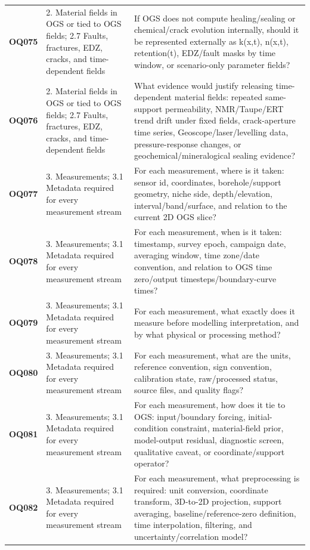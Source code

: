 \begin{longtable}{@{}L{0.10\textwidth} L{0.23\textwidth} L{0.59\textwidth}@{}}
\addlinespace[0.16em]
\textbf{OQ075} & 2. Material fields in OGS or tied to OGS fields; 2.7 Faults, fractures, EDZ, cracks, and time-dependent fields & If OGS does not compute healing/sealing or chemical/crack evolution internally, should it be represented externally as k(x,t), n(x,t), retention(t), EDZ/fault masks by time window, or scenario-only parameter fields?\\
\addlinespace[0.16em]
\textbf{OQ076} & 2. Material fields in OGS or tied to OGS fields; 2.7 Faults, fractures, EDZ, cracks, and time-dependent fields & What evidence would justify releasing time-dependent material fields: repeated same-support permeability, NMR/Taupe/ERT trend drift under fixed fields, crack-aperture time series, Geoscope/laser/levelling data, pressure-response changes, or geochemical/mineralogical sealing evidence?\\
\addlinespace[0.16em]
\textbf{OQ077} & 3. Measurements; 3.1 Metadata required for every measurement stream & For each measurement, where is it taken: sensor id, coordinates, borehole/support geometry, niche side, depth/elevation, interval/band/surface, and relation to the current 2D OGS slice?\\
\addlinespace[0.16em]
\textbf{OQ078} & 3. Measurements; 3.1 Metadata required for every measurement stream & For each measurement, when is it taken: timestamp, survey epoch, campaign date, averaging window, time zone/date convention, and relation to OGS time zero/output timesteps/boundary-curve times?\\
\addlinespace[0.16em]
\textbf{OQ079} & 3. Measurements; 3.1 Metadata required for every measurement stream & For each measurement, what exactly does it measure before modelling interpretation, and by what physical or processing method?\\
\addlinespace[0.16em]
\textbf{OQ080} & 3. Measurements; 3.1 Metadata required for every measurement stream & For each measurement, what are the units, reference convention, sign convention, calibration state, raw/processed status, source files, and quality flags?\\
\addlinespace[0.16em]
\textbf{OQ081} & 3. Measurements; 3.1 Metadata required for every measurement stream & For each measurement, how does it tie to OGS: input/boundary forcing, initial-condition constraint, material-field prior, model-output residual, diagnostic screen, qualitative caveat, or coordinate/support operator?\\
\addlinespace[0.16em]
\textbf{OQ082} & 3. Measurements; 3.1 Metadata required for every measurement stream & For each measurement, what preprocessing is required: unit conversion, coordinate transform, 3D-to-2D projection, support averaging, baseline/reference-zero definition, time interpolation, filtering, and uncertainty/correlation model?\\

\end{longtable}
